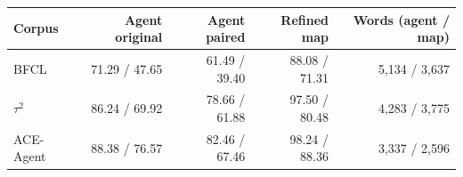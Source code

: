 \begin{tabular}{lrrrr}
\toprule
Corpus & Agent original & Agent paired & Refined map & Words (agent / map) \\
\midrule
BFCL & 71.29 / 47.65 & 61.49 / 39.40 & 88.08 / 71.31 & 5,134 / 3,637 \\
$\tau^2$ & 86.24 / 69.92 & 78.66 / 61.88 & 97.50 / 80.48 & 4,283 / 3,775 \\
ACE-Agent & 88.38 / 76.57 & 82.46 / 67.46 & 98.24 / 88.36 & 3,337 / 2,596 \\
\bottomrule
\end{tabular}
